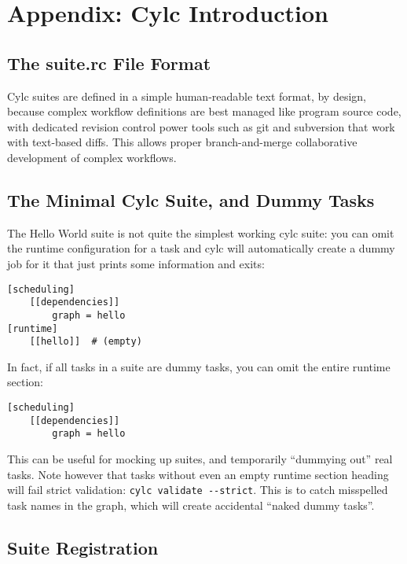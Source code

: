 \section{Appendix: Cylc Introduction}
\label{Appendix Cylc Introduction}


\subsection{The suite.rc File Format}

Cylc suites are defined in a simple human-readable text format, by design,
because complex workflow definitions are best managed like program source code,
with dedicated revision control power tools such as git and subversion that
work with text-based diffs.  This allows proper branch-and-merge collaborative
development of complex workflows.

\subsection{The Minimal Cylc Suite, and Dummy Tasks}

The Hello World suite is not quite the simplest working cylc suite: you can
omit the runtime configuration for a task and cylc will automatically create a
dummy job for it that just prints some information and exits:

\begin{lstlisting}[language=suiterc]
[scheduling]
    [[dependencies]]
        graph = hello
[runtime]
    [[hello]]  # (empty)
\end{lstlisting}

In fact, if all tasks in a suite are dummy tasks, you can omit the entire
runtime section:
\begin{lstlisting}[language=suiterc]
[scheduling]
    [[dependencies]]
        graph = hello
\end{lstlisting}

This can be useful for mocking up suites, and temporarily ``dummying out'' real
tasks.  Note however that tasks without even an empty runtime section heading
will fail strict validation: \lstinline=cylc validate --strict=.  This is to
catch misspelled task names in the graph, which will create accidental ``naked
dummy tasks''.

\subsection{Suite Registration}

